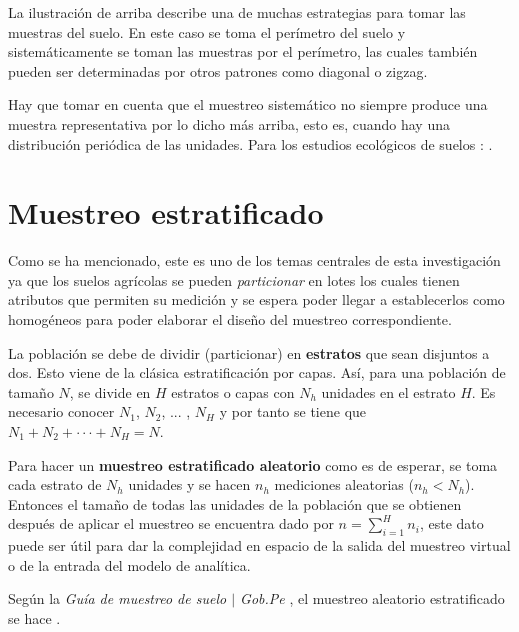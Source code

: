 \documentclass{report}
\begin{document}
La ilustración de arriba describe una de muchas estrategias \cite{lassaga-2011} \cite{gobpe-ministerio-del-ambiente-2014} para tomar las muestras del suelo. En este caso se toma el perímetro del suelo y sistemáticamente se toman las muestras por el perímetro, las cuales también pueden ser determinadas por otros patrones como diagonal o zigzag.

\bigbreak

Hay que tomar en cuenta que el muestreo sistemático no siempre produce una muestra representativa por lo dicho más arriba, esto es, cuando hay una distribución periódica de las unidades. Para los estudios ecológicos de suelos \cite{lohr-2009}: .

\section{Muestreo estratificado}

Como se ha mencionado, este es uno de los temas centrales de esta investigación ya que los suelos agrícolas se pueden \textit{particionar} en lotes los cuales tienen atributos que permiten su medición y se espera poder llegar a establecerlos como homogéneos para poder elaborar el diseño del muestreo correspondiente.

\bigbreak

La población se debe de dividir (particionar) en \textbf{estratos} que sean disjuntos a dos. Esto viene de la clásica estratificación por capas. Así, para una población de tamaño $N$, se divide en $H$ estratos o capas con $N_h$ unidades en el estrato $H$. Es necesario conocer $N_1$, $N_2$, ... , $N_H$ y por tanto se tiene que $N_1 + N_2 + \cdot \cdot \cdot + N_H = N$.

\bigbreak

Para hacer un \textbf{muestreo estratificado aleatorio} como es de esperar, se toma cada estrato de $N_h$ unidades y se hacen $n_h$ mediciones aleatorias ($n_h < N_h$). Entonces el tamaño de todas las unidades de la población que se obtienen después de aplicar el muestreo se encuentra dado por $n = \sum \limits_{i=1}^H n_i$, este dato puede ser útil para dar la complejidad en espacio de la salida del muestreo virtual o de la entrada del modelo de analítica.

\bigbreak

Según la \textit{Guía de muestreo de suelo $\mid$ Gob.Pe} \cite{gobpe-ministerio-del-ambiente-2014}, el muestreo aleatorio estratificado se hace .
\end{document}
